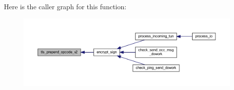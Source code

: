 Here is the caller graph for this function\+:
\nopagebreak
\begin{figure}[H]
\begin{center}
\leavevmode
\includegraphics[width=350pt]{group__data__crypto_gad27b20736f89d38d0d2e0c2e35f7a0e3_icgraph}
\end{center}
\end{figure}


